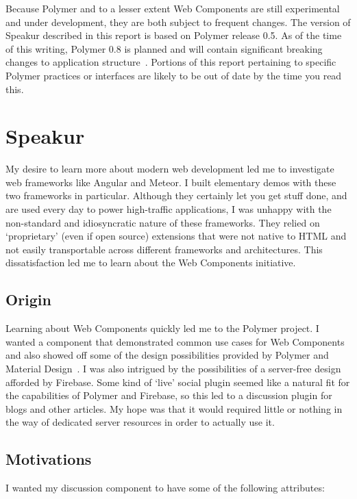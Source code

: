Because Polymer and to a lesser extent Web Components are still experimental and under development, 
they are both subject to frequent changes.
The version of Speakur described in this report is based on Polymer release 0.5.
As of the time of this writing, Polymer 0.8 is planned and will contain significant breaking changes to application structure~\cite{michaelbleigh2015}.
Portions of this report pertaining to specific Polymer practices or interfaces are likely to be out of date by the time you read this.

\section{Speakur}
My desire to learn more about modern web development led me to investigate web frameworks like Angular and Meteor.
I built elementary demos with these two frameworks in particular.
Although they certainly let you get stuff done, and are used every day to power high-traffic applications, 
I was unhappy with the non-standard and idiosyncratic nature of these frameworks. 
They relied on `proprietary' (even if open source) extensions that were not native to HTML and not easily transportable across different frameworks and architectures.
This dissatisfaction led me to learn about the Web Components initiative.

\subsection{Origin}
Learning about Web Components quickly led me to the Polymer project.
I wanted a component that demonstrated common use cases for Web Components and also showed off some of the design possibilities provided by Polymer and 
Material Design~\cite{imura2015}.
I was also intrigued by the possibilities of a server-free design afforded by Firebase.
Some kind of `live' social plugin seemed like a natural fit for the capabilities of Polymer and Firebase, so this led to a discussion plugin for blogs and other articles.
My hope was that it would required little or nothing in the way of dedicated server resources in order to actually use it. 

\subsection{Motivations}
\label{motivations}
I wanted my discussion component to have some of the following attributes:

